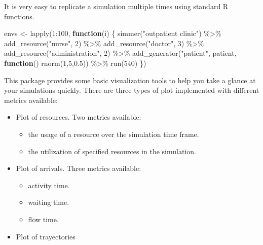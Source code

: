 \documentclass[
]{book}
\newenvironment{Shaded}{\begin{snugshade}}{\end{snugshade}}
\newcommand{\ControlFlowTok}[1]{\textcolor[rgb]{0.13,0.29,0.53}{\textbf{#1}}}
\newcommand{\DecValTok}[1]{\textcolor[rgb]{0.00,0.00,0.81}{#1}}
\newcommand{\FloatTok}[1]{\textcolor[rgb]{0.00,0.00,0.81}{#1}}
\newcommand{\FunctionTok}[1]{\textcolor[rgb]{0.00,0.00,0.00}{#1}}
\newcommand{\NormalTok}[1]{#1}
\newcommand{\OtherTok}[1]{\textcolor[rgb]{0.56,0.35,0.01}{#1}}
\newcommand{\SpecialCharTok}[1]{\textcolor[rgb]{0.00,0.00,0.00}{#1}}
\newcommand{\StringTok}[1]{\textcolor[rgb]{0.31,0.60,0.02}{#1}}
\providecommand{\tightlist}{%
  \setlength{\itemsep}{0pt}\setlength{\parskip}{0pt}}
\theoremstyle{definition}
\theoremstyle{definition}
\theoremstyle{definition}
\theoremstyle{definition}
\theoremstyle{remark}
\begin{document}
It is very easy to replicate a simulation multiple times using standard R functions.

\begin{Shaded}
\begin{Highlighting}[]
\NormalTok{envs }\OtherTok{\textless{}{-}} \FunctionTok{lapply}\NormalTok{(}\DecValTok{1}\SpecialCharTok{:}\DecValTok{100}\NormalTok{, }\ControlFlowTok{function}\NormalTok{(i) \{}
  \FunctionTok{simmer}\NormalTok{(}\StringTok{"outpatient clinic"}\NormalTok{) }\SpecialCharTok{\%\textgreater{}\%}
    \FunctionTok{add\_resource}\NormalTok{(}\StringTok{"nurse"}\NormalTok{, }\DecValTok{2}\NormalTok{) }\SpecialCharTok{\%\textgreater{}\%}
    \FunctionTok{add\_resource}\NormalTok{(}\StringTok{"doctor"}\NormalTok{, }\DecValTok{3}\NormalTok{) }\SpecialCharTok{\%\textgreater{}\%}
    \FunctionTok{add\_resource}\NormalTok{(}\StringTok{"administration"}\NormalTok{, }\DecValTok{2}\NormalTok{) }\SpecialCharTok{\%\textgreater{}\%}
    \FunctionTok{add\_generator}\NormalTok{(}\StringTok{"patient"}\NormalTok{, patient, }\ControlFlowTok{function}\NormalTok{() }\FunctionTok{rnorm}\NormalTok{(}\DecValTok{1}\NormalTok{,}\DecValTok{5}\NormalTok{,}\FloatTok{0.5}\NormalTok{)) }\SpecialCharTok{\%\textgreater{}\%}
    \FunctionTok{run}\NormalTok{(}\DecValTok{540}\NormalTok{)}
\NormalTok{\})}
\end{Highlighting}
\end{Shaded}

This package provides some basic visualization tools to help you take a glance at your simulations quickly. There are three types of plot implemented with different metrics available:

\begin{itemize}
\tightlist
\item
  Plot of resources. Two metrics available:

  \begin{itemize}
  \tightlist
  \item
    the usage of a resource over the simulation time frame.
  \item
    the utilization of specified resources in the simulation.
  \end{itemize}
\item
  Plot of arrivals. Three metrics available:

  \begin{itemize}
  \tightlist
  \item
    activity time.
  \item
    waiting time.
  \item
    flow time.
  \end{itemize}
\item
  Plot of trayectories
\end{itemize}
\end{document}
